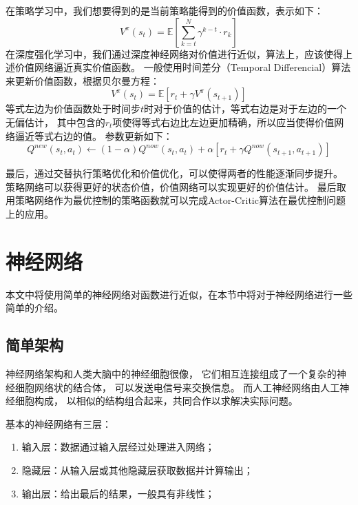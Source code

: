 \documentclass[AutoFakeBold]{LZUThesis}
\begin{document}
在策略学习中，我们想要得到的是当前策略能得到的价值函数，表示如下：
\begin{equation}
  V^\pi(s_t) = \mathbb{E} \left[ \sum_{k = t}^{N}
  \gamma^{k - t} \cdot r_k \right]
\end{equation}
在深度强化学习中，我们通过深度神经网络对价值进行近似，算法上，应该使得上述价值网络逼近真实价值函数。
一般使用时间差分（Temporal Differencial）算法来更新价值函数，根据贝尔曼方程：
\begin{equation}
  V^{\pi}(s_t) = \mathbb{E} \left[ r_t + \gamma V^\pi(s_{t + 1}) \right]
\end{equation}
等式左边为价值函数处于时间步$t$时对于价值的估计，等式右边是对于左边的一个无偏估计，
其中包含的$r_t$项使得等式右边比左边更加精确，所以应当使得价值网络逼近等式右边的值。
参数更新如下：
\begin{equation}
  Q^{new}(s_t, a_t) \leftarrow (1 - \alpha) Q^{now}(s_t, a_t) 
  + \alpha [ r_t + \gamma Q^{now}(s_{t + 1}, a_{t + 1}) ]
\end{equation}

最后，通过交替执行策略优化和价值优化，可以使得两者的性能逐渐同步提升。
策略网络可以获得更好的状态价值，价值网络可以实现更好的价值估计。
最后取用策略网络作为最优控制的策略函数就可以完成Actor-Critic算法在最优控制问题上的应用。

\section{神经网络}
本文中将使用简单的神经网络对函数进行近似，在本节中将对于神经网络进行一些简单的介绍。
\subsection{简单架构}
神经网络架构和人类大脑中的神经细胞很像，
它们相互连接组成了一个复杂的神经细胞网络状的结合体，
可以发送电信号来交换信息。
而人工神经网络由人工神经细胞构成，
以相似的结构组合起来，共同合作以求解决实际问题。

基本的神经网络有三层\cite{noauthor_-_nodate}：
\begin{enumerate}
  \item 输入层：数据通过输入层经过处理进入网络；
  \item 隐藏层：从输入层或其他隐藏层获取数据并计算输出；
  \item 输出层：给出最后的结果，一般具有非线性；
\end{enumerate}
\end{document}
